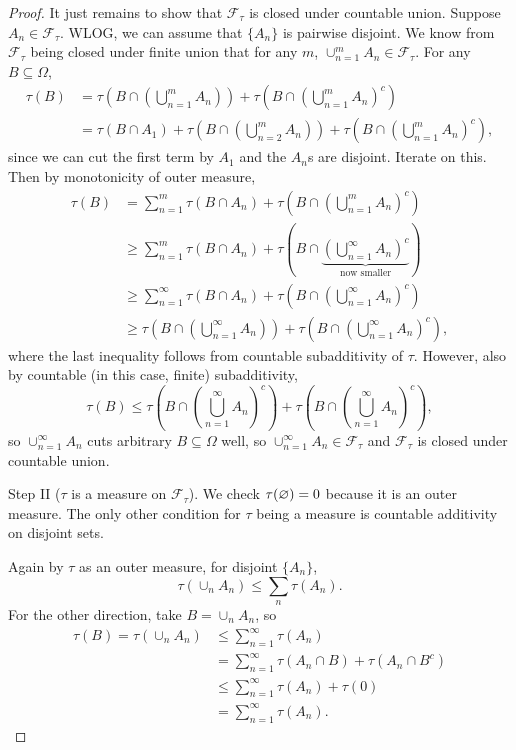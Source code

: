 \begin{proof}
	It just remains to show that $\mathscr{F}_\tau$ is closed under countable union. Suppose $A_n \in \mathscr{F}_\tau$. WLOG, we can assume that $\{A_n\}$ is pairwise disjoint. We know from $\mathscr{F}_\tau$ being closed under finite union that for any $m$, $\cup_{n=1}^{m} A_n \in \mathscr{F}_\tau$. For any $B \subseteq \Omega$, 
	\begin{align*}
		\tau(B) &= \tau \left( B \cap \left( \bigcup\limits_{n=1}^{m} A_n \right) \right) + \tau \left( B \cap \left( \bigcup\limits_{n=1}^{m} A_n \right)^{c} \right)\\
		&= \tau(B\cap A_1) + \tau\left( B \cap \left( \bigcup\limits_{n=2}^{m} A_n \right) \right) + \tau \left( B \cap \left( \bigcup\limits_{n=1}^{m} A_n  \right)^{c} \right)
	,\end{align*}
	since we can cut the first term by $A_1$ and the $A_n$s are disjoint. Iterate on this. Then by monotonicity of outer measure,
	\begin{align*}
		\tau(B) &= \sum\limits_{n=1}^{m} \tau(B \cap A_n) + \tau\left( B \cap \left( \bigcup\limits_{n=1}^{m} A_n \right)^{c} \right) \\
				&\ge \sum\limits_{n=1}^{m} \tau(B \cap A_n) + \tau \left( B \cap \underbrace{\left( \bigcup\limits_{n=1}^{\infty} A_n \right)^{c}}_{\text{now smaller}} \right) \\
				&\ge \sum\limits_{n=1}^{\infty} \tau(B \cap A_n) + \tau \left( B \cap \left( \bigcup\limits_{n=1}^{\infty} A_n \right)^{c} \right)	\\
				&\ge \tau\left(B \cap \left( \bigcup\limits_{n=1}^{\infty} A_n \right)\right) + \tau \left( B \cap \left( \bigcup\limits_{n=1}^{\infty} A_n \right)^{c}  \right)
	,\end{align*}
	where the last inequality follows from countable subadditivity of $\tau$. However, also by countable (in this case, finite) subadditivity, \[
		\tau(B) \le \tau\left(B \cap \left( \bigcup\limits_{n=1}^{\infty} A_n \right)^{c}\right) + \tau \left( B \cap \left( \bigcup\limits_{n=1}^{\infty} A_n \right)^{c} \right)
	,\] 
	so $\cup_{n=1}^{\infty}A_n$ cuts arbitrary $B \subseteq \Omega$ well, so $\cup_{n=1}^{\infty}A_n \in \mathscr{F}_\tau$ and $\mathscr{F}_\tau$ is closed under countable union.

	Step II ($\tau$ is a measure on $\mathscr{F}_\tau$). We check $\tau(\varnothing) = 0$ because it is an outer measure.	The only other condition for $\tau$ being a measure is countable additivity on disjoint sets.

	Again by $\tau$ as an outer measure, for disjoint $\{A_n\}$, \[
		\tau\left( \cup_n A_n \right) \le \sum_n \tau(A_n)
	.\] For the other direction, take $B = \cup_n A_n$, so
	\begin{align*}
		\tau(B) = \tau(\cup_n A_n) &\le \sum\limits_{n=1}^{\infty} \tau(A_n) \\
								   &= \sum\limits_{n=1}^{\infty} \tau(A_n \cap B)  + \tau\left( A_n \cap B^{c} \right) \\
								   &\le \sum\limits_{n=1}^{\infty} \tau(A_n) + \tau(0) \\
								   &= \sum\limits_{n=1}^{\infty} \tau(A_n)
	.\end{align*}


\end{proof}

